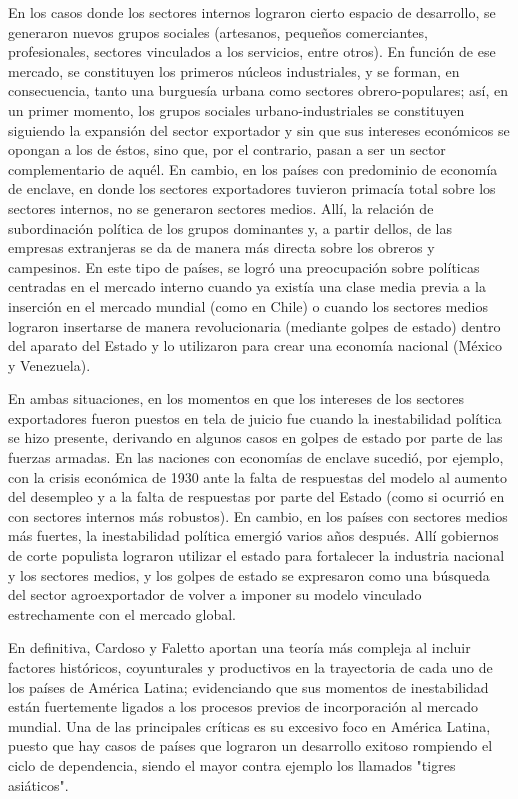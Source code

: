 \documentclass{article}
\begin{document}
En los casos donde los sectores internos lograron cierto espacio de desarrollo, se generaron
nuevos grupos sociales (artesanos, pequeños comerciantes, profesionales, sectores vinculados
a los servicios, entre otros). En función de ese mercado, se constituyen los primeros 
núcleos industriales, y se forman, en consecuencia, tanto una burguesía urbana como sectores 
obrero-populares; así, en un primer momento, los grupos sociales urbano-industriales se 
constituyen siguiendo la expansión del sector exportador y sin que sus intereses económicos 
se opongan a los de éstos, sino que, por el contrario, pasan a ser un sector complementario 
de aquél. En cambio, en los países con predominio de economía de enclave, en donde los 
sectores exportadores tuvieron primacía total sobre los sectores internos, no se generaron 
sectores medios. Allí, la relación de subordinación política de los grupos dominantes y, a 
partir dellos, de las empresas extranjeras se da de manera más directa sobre los obreros y 
campesinos. En este tipo de países, se logró una preocupación sobre políticas centradas en 
el mercado interno cuando ya existía una clase media previa a la inserción en el mercado 
mundial (como en Chile) o cuando los sectores medios lograron insertarse de manera 
revolucionaria (mediante golpes de estado) dentro del aparato  del Estado y lo utilizaron 
para crear una economía nacional (México y Venezuela).

En ambas situaciones, en los momentos en que los intereses de los sectores exportadores
fueron puestos en tela de juicio fue cuando la inestabilidad política se hizo presente, 
derivando en algunos casos en golpes de estado por parte de las fuerzas armadas. En las
naciones con economías de enclave sucedió, por ejemplo, con la crisis económica de 1930
ante la falta de respuestas del modelo al aumento del desempleo y a la falta de respuestas
por parte del Estado (como si ocurrió en con sectores internos más robustos). En cambio,
en los países con sectores medios más fuertes, la inestabilidad política emergió varios
años después. Allí gobiernos de corte populista lograron utilizar el estado para fortalecer
la industria nacional y los sectores medios, y los golpes de estado se expresaron como
una búsqueda del sector agroexportador de volver a imponer su modelo vinculado estrechamente
con el mercado global.

En definitiva, Cardoso y Faletto aportan una teoría más compleja al incluir factores
históricos, coyunturales y productivos en la trayectoria de cada uno de los países de 
América Latina; evidenciando que sus momentos de inestabilidad están fuertemente ligados
a los procesos previos de incorporación al mercado mundial. Una de las principales críticas
es su excesivo foco en América Latina, puesto que hay casos de países que lograron un 
desarrollo exitoso rompiendo el ciclo de dependencia, siendo el mayor contra ejemplo los
llamados "tigres asiáticos".
\end{document}
